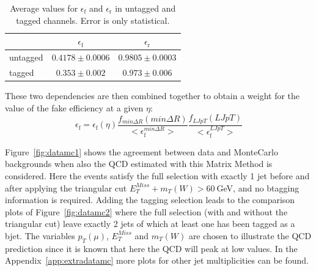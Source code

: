 \begin{table}\centering
\begin{tabular}{l c c }
\toprule
 & $\epsilon_\mathrm{f}$ &  $\epsilon_\mathrm{r}$  \\\midrule
untagged & $0.4178 \pm 0.0006 $ & $ 0.9805 \pm 0.0003 $ \\
tagged   & $0.353  \pm 0.002 $ & $ 0.973 \pm 0.006 $ \\\bottomrule
\end{tabular}\caption{Average values for $\epsilon_\mathrm{f}$ and  $\epsilon_\mathrm{r}$ in untagged and tagged channels. Error is only statistical.}\label{tab:averageeffs}
\end{table} 

These two dependencies are then combined together to obtain a weight for the value of the fake efficiency at a given $\eta$:
\begin{equation}
\epsilon_\mathrm{f} = \epsilon_\mathrm{f}(\eta) \dfrac{f_{min\Delta R}(min\Delta R)}{<\epsilon_\mathrm{f}^{min\Delta R}>}\dfrac{f_{LJpT}(LJpT)}{<\epsilon_\mathrm{f}^{LJpT}>}
\end{equation}

Figure~\ref{fig:datamc1} shows the agreement between data and MonteCarlo backgrounds when also the QCD estimated with this Matrix Method is considered. Here the events satisfy the full selection with exactly 1 jet before and after applying the triangular cut $E_T^{Miss} + m_T(W)>60~$GeV, and no btagging information is required. Adding the tagging selection leads to the comparison plots of Figure~\ref{fig:datamc2} where the full selection (with and without the triangular cut) leave exactly 2 jets of which at least one has been tagged as a bjet. The variables $p_T(\mu)$, $E_T^{Miss}$ and $m_T(W)$ are chosen to illustrate the QCD prediction since it is known that here the QCD will peak at low values. In the Appendix~\ref{app:extradatamc} more plots for other jet multiplicities can be found.



